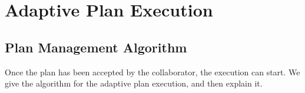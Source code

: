 \section{Adaptive Plan Execution}
\label{planExecution}

\subsection{Plan Management Algorithm}
\label{sec:algo}
Once the plan has been accepted by the collaborator, the execution can start. We give the algorithm for the adaptive plan execution, and then explain it.



        
         
             



